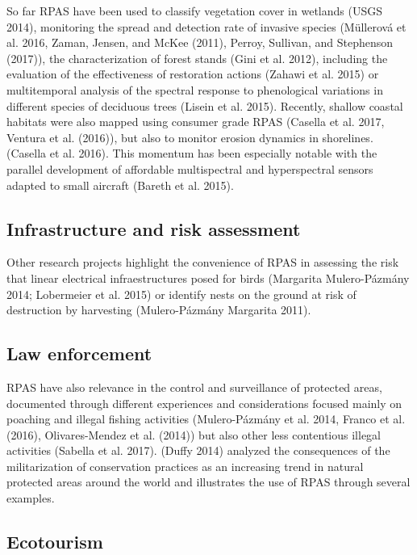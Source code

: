 \documentclass[]{interact}
\theoremstyle{plain}%
\theoremstyle{definition}
\theoremstyle{remark}
\begin{document}
So far RPAS have been used to classify vegetation cover in wetlands
(USGS 2014), monitoring the spread and detection rate of invasive
species (Müllerová et al. 2016, Zaman, Jensen, and McKee (2011), Perroy,
Sullivan, and Stephenson (2017)), the characterization of forest stands
(Gini et al. 2012), including the evaluation of the effectiveness of
restoration actions (Zahawi et al. 2015) or multitemporal analysis of
the spectral response to phenological variations in different species of
deciduous trees (Lisein et al. 2015). Recently, shallow coastal habitats
were also mapped using consumer grade RPAS (Casella et al. 2017, Ventura
et al. (2016)), but also to monitor erosion dynamics in shorelines.
(Casella et al. 2016). This momentum has been especially notable with
the parallel development of affordable multispectral and hyperspectral
sensors adapted to small aircraft (Bareth et al. 2015).

\subsection{Infrastructure and risk
assessment}\label{infrastructure-and-risk-assessment}

Other research projects highlight the convenience of RPAS in assessing
the risk that linear electrical infraestructures posed for birds
(Margarita Mulero-Pázmány 2014; Lobermeier et al. 2015) or identify
nests on the ground at risk of destruction by harvesting (Mulero-Pázmány
Margarita 2011).

\subsection{Law enforcement}\label{law-enforcement}

RPAS have also relevance in the control and surveillance of protected
areas, documented through different experiences and considerations
focused mainly on poaching and illegal fishing activities
(Mulero-Pázmány et al. 2014, Franco et al. (2016), Olivares-Mendez et
al. (2014)) but also other less contentious illegal activities (Sabella
et al. 2017). (Duffy 2014) analyzed the consequences of the
militarization of conservation practices as an increasing trend in
natural protected areas around the world and illustrates the use of RPAS
through several examples.

\subsection{Ecotourism}\label{ecotourism}
\end{document}
